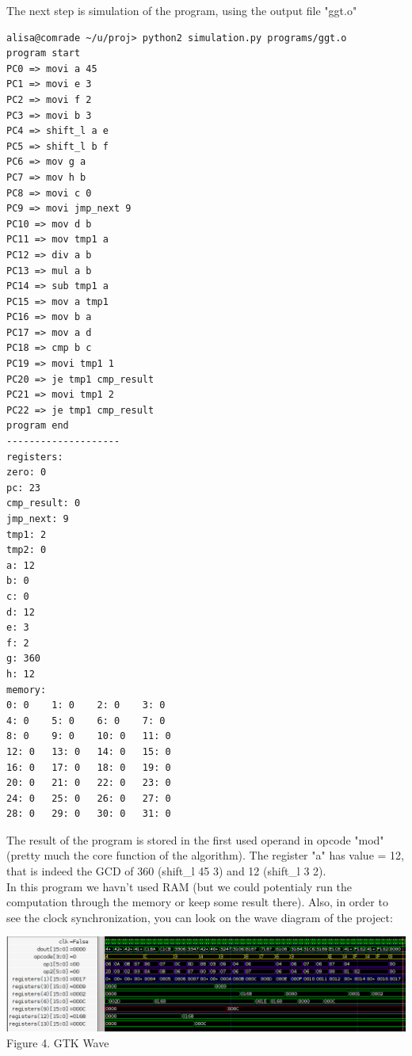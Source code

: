 \documentclass[11pt,a4paper]{article}
\begin{document}
The next step is simulation of the program, using the output file "ggt.o"
\begin{verbatim}
alisa@comrade ~/u/proj> python2 simulation.py programs/ggt.o
program start
PC0 => movi a 45
PC1 => movi e 3
PC2 => movi f 2
PC3 => movi b 3
PC4 => shift_l a e
PC5 => shift_l b f
PC6 => mov g a
PC7 => mov h b
PC8 => movi c 0
PC9 => movi jmp_next 9
PC10 => mov d b
PC11 => mov tmp1 a
PC12 => div a b
PC13 => mul a b
PC14 => sub tmp1 a
PC15 => mov a tmp1
PC16 => mov b a
PC17 => mov a d
PC18 => cmp b c
PC19 => movi tmp1 1
PC20 => je tmp1 cmp_result
PC21 => movi tmp1 2
PC22 => je tmp1 cmp_result
program end
--------------------
registers:
zero: 0
pc: 23
cmp_result: 0
jmp_next: 9
tmp1: 2
tmp2: 0
a: 12
b: 0
c: 0
d: 12
e: 3
f: 2
g: 360
h: 12
memory:
0: 0    1: 0    2: 0    3: 0
4: 0    5: 0    6: 0    7: 0
8: 0    9: 0    10: 0   11: 0
12: 0   13: 0   14: 0   15: 0
16: 0   17: 0   18: 0   19: 0
20: 0   21: 0   22: 0   23: 0
24: 0   25: 0   26: 0   27: 0
28: 0   29: 0   30: 0   31: 0
\end{verbatim}
The result of the program is stored in the first used operand in opcode "mod" (pretty much the core function of the algorithm). The register "a" has value = 12, that is indeed the GCD of 360 (shift\_l 45 3) and 12 (shift\_l 3 2).\\
In this program we havn't used RAM (but we could potentialy run the computation through the memory or keep some result there).
Also, in order to see the clock synchronization, you can look on the wave diagram of the project:\\
\begin{center}
\includegraphics[scale=0.5]{pics/gtkwave.png}\\
Figure 4. GTK Wave
\end{center}			
			
\newpage
\end{document}
